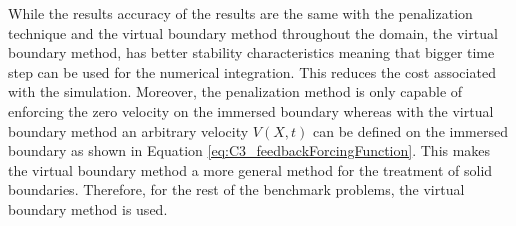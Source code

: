While the results accuracy of the results are the same with the penalization technique and the virtual boundary method throughout the domain, the virtual boundary method, has better stability characteristics meaning that bigger time step can be used for the numerical integration. This reduces the cost associated with the simulation. Moreover, the penalization method is only capable of enforcing the zero velocity on the immersed boundary whereas with the virtual boundary method an arbitrary velocity $V(X, t)$ can be defined on the immersed boundary as shown in Equation \eqref{eq:C3_feedbackForcingFunction}. This makes the virtual boundary method a more general method for the treatment of solid boundaries. Therefore, for the rest of the benchmark problems, the virtual boundary method is used.